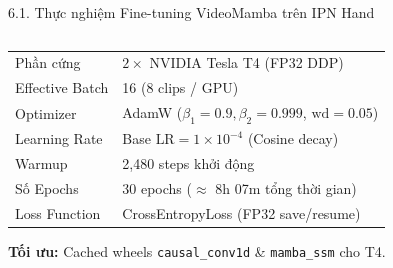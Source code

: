 \documentclass[aspectratio=169,9pt]{beamer}
\newcommand{\smallnote}[1]{{\fontsize{7.1}{8.4}\selectfont #1\par}}
\newcommand{\source}[1]{}
\begin{document}
\begin{frame}{6.1. Thực nghiệm Fine-tuning VideoMamba trên IPN Hand}
\begin{columns}[T,onlytextwidth]
\begin{column}{0.48\textwidth}
\begin{tcolorbox}[titlepanel,title=Cấu hình Huấn luyện chi tiết (Recipe),equal height group=s6_1]
{\begin{tabularx}{\linewidth}{@{}L{2.55cm}Y@{}}
          Phần cứng & $2\times$ NVIDIA Tesla T4 (FP32 DDP)\\
          Effective Batch & 16 (8 clips / GPU)\\
          Optimizer & AdamW ($\beta_1=0.9, \beta_2=0.999$, $\text{wd}=0.05$)\\
          Learning Rate & Base $\text{LR}=1\times 10^{-4}$ (Cosine decay)\\
          Warmup & 2,480 steps khởi động\\
          Số Epochs & 30 epochs ($\approx$ 8h 07m tổng thời gian)\\
          Loss Function & CrossEntropyLoss (FP32 save/resume)\\
          \bottomrule
        \end{tabularx}}
        \vspace{0.03cm}
        \smallnote{\textbf{Tối ưu:} Cached wheels \texttt{causal\_conv1d} \& \texttt{mamba\_ssm} cho T4.}
      \end{tcolorbox}
    \end{column}
  \end{columns}
  \vfill
  \source{Thực nghiệm nhóm: Huấn luyện trên Kaggle $2\times$ T4 GPU, dataset IPN Hand.}
\end{frame}
\end{document}
